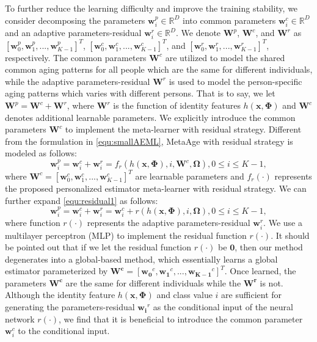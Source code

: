 \documentclass[journal,twoside]{IEEEtran}
\begin{document}
To further reduce the learning difficulty and improve the training stability, we consider decomposing the parameters $\bm{w}_i^{p} \in \mathbb{R}^{D}$ into common parameters  $\bm{w}_i^c \in \mathbb{R}^{D}$ and an adaptive parameters-residual $\bm{w}_i^r \in \mathbb{R}^{D}$. We denote $\bm{W}^{p}$, $\bm{W}^c$, and $\bm{W}^r$ as $[\bm{w}_0^p, \bm{w}_1^p, ..., \bm{w}_{K-1}^p]^T$, $[\bm{w}_0^c, \bm{w}_1^c, ..., \bm{w}_{K-1}^c]^T$, and $[\bm{w}_0^r, \bm{w}_1^r, ..., \bm{w}_{K-1}^r]^T$, respectively. The common parameters $\bm{W}^c$ are utilized to model the shared common aging patterns for all people which are the same for different individuals, while the adaptive parameters-residual $\bm{W}^r$ is used to model the person-specific aging patterns which varies with different persons. That is to say, we let $\bm{W}^{p} = \bm{W}^c + \bm{W}^r$, where $\bm{W}^r$ is the function of identity features $h(\bm{x},\bm{\Phi})$ and $\bm{W}^c$ denotes additional learnable parameters.  We explicitly introduce the common parameters $\bm{W}^c$ to implement the meta-learner with residual strategy. Different from the formulation in \eqref{equ:smallAEML}, MetaAge with residual strategy is modeled as follows:
\begin{equation}
  \bm{w}_i^{p} = \bm{w}_i^c  + \bm{w}_i^r = f_r(h(\bm{x},\bm{\Phi}),i,\bm{W}^c,\bm{\Omega}), 0 \leq i \leq K-1,
  \label{equ:residual1}
\end{equation}
where $\bm{W}^c = [\bm{w}_0^c, \bm{w}_1^c, ..., \bm{w}_{K-1}^c]^T$ are learnable parameters and $f_r(\cdot)$ represents the proposed personalized estimator meta-learner with residual strategy. 
We can further expand \eqref{equ:residual1} as follows:
\begin{equation}
  \bm{w}_i^{p} = \bm{w}_i^c  + \bm{w}_i^r = \bm{w}_i^c + r(h(\bm{x},\bm{\Phi}),i,\bm{\Omega}), 0 \leq i \leq K-1,
  \label{equ:residual2}
\end{equation}
where function $r(\cdot)$ represents the adaptive parameters-residual $\bm{w}_i^r$. We use a multilayer perceptron (MLP) to implement the residual function $r(\cdot)$. It should be pointed out that if we let the residual function $r(\cdot)$ be $\bm{0}$, then our method degenerates into a global-based method, which essentially learns a global estimator parameterized by $\bm{W^c} = [\bm{w_0}^c,\bm{w_1}^c,...,\bm{w_{K-1}}^c]^T$. Once learned, the parameters $\bm{W^c}$ are the same for different individuals while the $\bm{W^r}$ is not.
Although the identity feature $h(\bm{x},\bm{\Phi})$ and class value $i$ are sufficient for generating the parameters-residual $\bm{w_i}^r$ as the conditional input of the neural network $r(\cdot)$, we find that it is beneficial to introduce the common parameter $\bm{w}_i^c$ to the conditional input.
\end{document}
